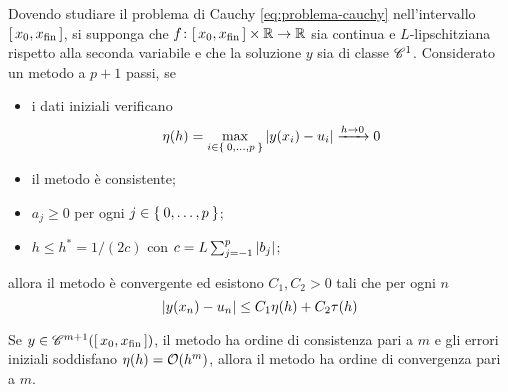 	\begin{teorema}\label{th:metodo-lm-convergenza}
		Dovendo studiare il problema di Cauchy \eqref{eq:problema-cauchy} nell'intervallo \([\, x_0, x_{\textup{fin}} \,]\), si supponga che \(f \colon [\, x_0, x_{\textup{fin}} \,] \times \mathbb{R} \to \mathbb{R}\) sia continua e \(L\)-lipschitziana rispetto alla seconda variabile e che la soluzione \(y\) sia di classe \(\mathscr{C}^1\). Considerato un metodo  a \(p + 1\) passi, se 
		\begin{itemize}
			\item i dati iniziali verificano
			\begin{equation*}
				\eta (h) = \max_{i \in \Set{0, \dots, p}} \abs{y (x_i) - u_i} \xrightarrow{h \to 0} 0
			\end{equation*}
			\item il metodo è consistente;
			\item \(a_j \ge 0\) per ogni \(j \in \Set{0, \dots, p}\);
			\item \(h \le h^* = 1 / (2 c)\) con \(c = L \sum_{j = - 1}^p \abs{b_j}\);
		\end{itemize}
		allora il metodo  è convergente ed esistono \(C_1, C_2 > 0\) tali che per ogni \(n\)
		\begin{equation}
			\abs{y (x_n) - u_n} \le C_1 \eta (h) + C_2 \tau (h)
		\end{equation}
		
		Se \(y \in \mathscr{C}^{m + 1} ([\, x_0, x_{\textup{fin}} \,])\), il metodo ha ordine di consistenza pari a \(m\) e gli errori iniziali soddisfano \(\eta (h) = \order{h^m}\), allora il metodo ha ordine di convergenza pari a \(m\).
	\end{teorema}

